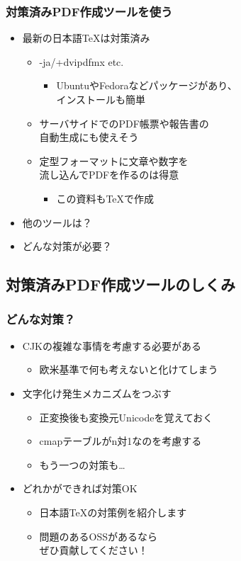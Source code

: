 \begin{frame}\frametitle{対策済みPDF作成ツールを使う}
  \begin{itemize}
  \item 最新の日本語\TeX は対策済み
    \begin{itemize}
    \item \LuaTeX -ja/\pTeX +dvipdfmx etc.
      \begin{itemize}
      \item UbuntuやFedoraなどパッケージがあり、 \\ インストールも簡単
      \end{itemize}
    \item サーバサイドでのPDF帳票や報告書の \\ 自動生成にも使えそう
    \item 定型フォーマットに文章や数字を \\ 流し込んでPDFを作るのは得意
      \begin{itemize}
      \item この資料も\TeX で作成
      \end{itemize}
    \end{itemize}
  \item 他のツールは？
  \item どんな対策が必要？
  \end{itemize}
\end{frame}

\subsection{対策済みPDF作成ツールのしくみ}
\begin{frame}\frametitle{どんな対策？}
  \begin{itemize}
  \item CJKの複雑な事情を考慮する必要がある
    \begin{itemize}
    \item 欧米基準で何も考えないと化けてしまう
    \end{itemize}
  \item 文字化け発生メカニズムをつぶす
    \begin{itemize}
    \item 正変換後も変換元Unicodeを覚えておく
    \item cmapテーブルがn対1なのを考慮する
    \item もう一つの対策も…
    \end{itemize}
  \item どれかができれば対策OK
    \begin{itemize}
    \item 日本語\TeX の対策例を紹介します
    \item 問題のあるOSSがあるなら \\ ぜひ貢献してください！
    \end{itemize}
  \end{itemize}
\end{frame}


